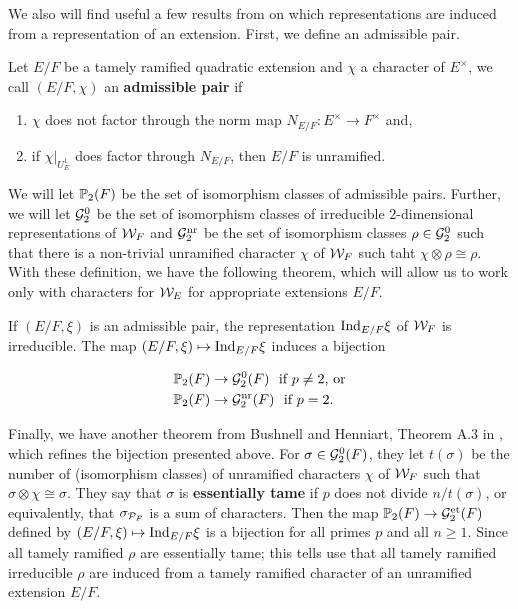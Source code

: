 We also will find useful a few results from \cite{Bushnell2006} on which representations are induced from a representation of an extension.
First, we define an admissible pair.
\begin{defn}
  Let $E/F$ be a tamely ramified quadratic extension and $\chi$ a character of $E^\times$, we call $(E/F, \chi)$ an \textbf{admissible pair} if
  \begin{enumerate}
  \item $\chi$ does not factor through the norm map $N_{E/F}: E^\times \to F^\times$ and,
    \item if $\chi|_{U_E^1}$ does factor through $N_{E/F}$, then $E/F$ is unramified.
  \end{enumerate}
\end{defn}

We will let $\mathbb{P}_2(F)$ be the set of isomorphism classes of admissible pairs. Further, we will let $\mathcal{G}_2^0$ be the set of isomorphism classes of irreducible $2$-dimensional representations of $\mathcal{W}_F$ and $\mathcal{G}_2^{\textrm{nr}}$ be the set of isomorphism classes $\rho \in \mathcal{G}_2^0$ such that there is a non-trivial unramified character $\chi$ of $\mathcal{W}_F$ such taht $\chi \otimes \rho \cong \rho$.
With these definition, we have the following theorem, which will allow us to work only with characters for $\mathcal{W}_E$ for appropriate extensions $E/F$.
\begin{theorem}
  If $(E/F, \xi)$ is an admissible pair, the representation $\textrm{Ind}_{E/F} \xi$ of $\mathcal{W}_F$ is irreducible. The map $(E/F, \xi) \mapsto \textrm{Ind}_{E/F} \xi$ induces a bijection

  \begin{align*}
    \mathbb{P}_2(F) &\to \mathcal{G}_2^0(F) \,\,  \text{ if } p \neq 2 \text{, or} \\
    \mathbb{P}_2(F) &\to \mathcal{G}_2^{\textrm{nr}}(F) \,\, \text{ if } p = 2.
  \end{align*}
\end{theorem} 

Finally, we have another theorem from Bushnell and Henniart, Theorem A.3 in \cite{BH2005}, which refines the bijection presented above.
For $\sigma \in \mathcal{G}_2^0(F)$, they let $t(\sigma)$ be the number of (isomorphism classes) of unramified characters $\chi$ of $\mathcal{W}_F$ such that $\sigma \otimes \chi \cong \sigma$.
They say that $\sigma$ is \textbf{essentially tame} if $p$ does not divide $n / t(\sigma)$, or equivalently, that $\sigma_{\mathcal{P}_F}$ is a sum of characters.
Then the map $\mathbb{P}_2(F) \to \mathcal{G}_2^{\textrm{et}}(F)$ defined by $(E/F, \xi) \mapsto \textrm{Ind}_{E/F} \xi$ is a bijection for all primes $p$ and all $n \geq 1$.
Since all tamely ramified $\rho$ are essentially tame; this tells use that all tamely ramified irreducible $\rho$ are induced from a tamely ramified character of an unramified extension $E/F$.

